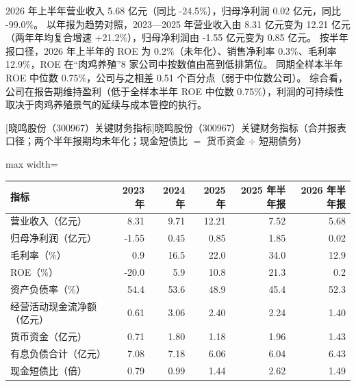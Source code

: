  2026 年上半年营业收入 5.68 亿元（同比 -24.5\%），归母净利润 0.02 亿元，同比 -99.0\%。 以年报为趋势对照，2023---2025 年营业收入由 8.31 亿元变为 12.21 亿元（两年年均复合增速 +21.2\%），归母净利润由 -1.55 亿元变为 0.85 亿元。 按半年报口径，2026 年上半年的 ROE 为 0.2\%（未年化）、销售净利率 0.3\%、毛利率 12.9\%，ROE 在“肉鸡养殖”8 家公司中按数值由高到低排第位。 同期全样本半年 ROE 中位数 0.75\%，公司与之相差 0.51 个百分点（弱于中位数公司）。 综合看，公司在报告期维持盈利（低于全样本半年 ROE 中位数 0.75\%），利润的可持续性取决于肉鸡养殖景气的延续与成本管控的执行。

\begin{center}\small\setlength{\tabcolsep}{3.4pt}
[晓鸣股份（300967）关键财务指标]{晓鸣股份（300967）关键财务指标（合并报表口径；两个半年报期均未年化；现金短债比 $=$ 货币资金 $\div$ 短期债务）}
\begin{adjustbox}{max width=\textwidth}
\begin{tabular}{@{}lrrrrr@{}}
\toprule
指标 & 2023 年 & 2024 年 & 2025 年 & 2025 年半年报 & 2026 年半年报 \\
\midrule
营业收入（亿元） & 8.31 & 9.71 & 12.21 & 7.52 & 5.68 \\
归母净利润（亿元） & -1.55 & 0.45 & 0.85 & 1.85 & 0.02 \\
毛利率（\%） & 0.9 & 16.5 & 22.0 & 34.0 & 12.9 \\
ROE（\%） & -20.0 & 5.9 & 10.8 & 21.3 & 0.2 \\
资产负债率（\%） & 54.4 & 53.6 & 48.9 & 45.4 & 52.3 \\
经营活动现金流净额（亿元） & 0.61 & 3.06 & 2.40 & 2.24 & 1.40 \\
货币资金（亿元） & 0.71 & 1.80 & 1.18 & 1.96 & 1.43 \\
有息负债合计（亿元） & 7.08 & 7.18 & 6.06 & 6.04 & 6.43 \\
现金短债比（倍） & 0.79 & 0.99 & 1.44 & 2.62 & 1.49 \\
\bottomrule
\end{tabular}
\end{adjustbox}
\end{center}

